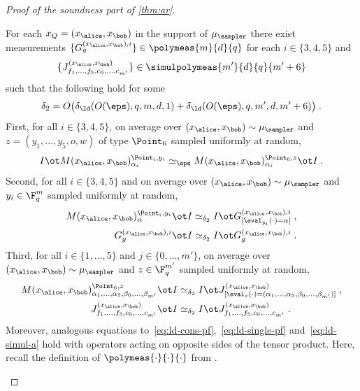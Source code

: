 \begin{proof}[Proof of the soundness part of \cref{thm:ar}]
  \begin{claim}
    \label{claim:ar-4}
    For each $x_Q=(x_\alice,x_\bob)$ in the support of $\mu_\sampler$ there
    exist measurements $\{G^{(x_\alice,x_\bob),i}_{g}\} \in \polymeas{m}{d}{q}$
    for each $i\in\{3,4,5\}$ and
    \begin{equation*}\{J^{({x}_\alice, {x}_\bob)}_{f_1, \dots, f_5, c_0,
      \dots, c_{m'}}\} \in \simulpolymeas{m'}{d}{q}{m'+6}
      \end{equation*}
      such that
    the following hold for some
    \begin{equation*}
      \delta_2 = O\big(\delta_{\ld}(O({\eps}), q, m, d, 1)+
      \delta_{\ld}(O({\eps}), q, m', d, m'+6)\big)\;.
    \end{equation*}
    First, for all $i\in \{3,4,5\}$, on average over $({x}_\alice, {x}_\bob)
    \sim \mu_{\sampler}$ and $z=(y_1,\ldots,y_5,o,w)$ of type $\Point_6$ sampled
    uniformly at random,
    \begin{equation}
      I \ot M({x}_\alice, {x}_\bob)^{ \Point_i, y_i}_{\alpha_i} \simeq_{\eps}
      M({x}_\alice, {x}_\bob)^{\Point_6, z}_{\alpha_i} \ot I\;.
      \label{eq:ld-cons-pf}
    \end{equation}
    Second, for all $i\in \{3,4,5\}$ and on average over $({x}_\alice, {x}_\bob)
    \sim \mu_{\sampler}$ and $y_i\in\F_q^m$ sampled uniformly at random,
    \begin{align}
      M({x}_\alice, {x}_\bob)^{\Point_i,  y_i}_{\alpha}\ot I
      &\simeq_{\delta_2} I \ot G^{({x}_\alice, {x}_\bob), i}_{[\eval_{y_i}(\cdot) =
        \alpha]}\;, \label{eq:ld-single-pf} \\
      G^{({x}_\alice, {x}_\bob), i}_{g} \ot I
      &\simeq_{\delta_2} I \ot G^{({x}_\alice, {x}_\bob),
        i}_{g}\;. \label{eq:ld-self-pf}
    \end{align}
    Third, for all $i\in\{1,\ldots,5\}$ and $j\in\{0,\ldots,m'\}$, on average
    over $({x}_\alice, {x}_\bob) \sim \mu_{\sampler}$ and $z\in\F_q^{m'}$
    sampled uniformly at random,
    \begin{align}
      M({x}_\alice, {x}_\bob)^{\Point_6,  z}_{\alpha_1, \ldots, \alpha_5,
      \beta_0, \ldots, \beta_{m'}} \ot I
      & \simeq_{\delta_2} I \ot J^{({x}_\alice, {x}_\bob) }_{[\eval_{z}(\cdot) =
        (\alpha_1,\ldots,\alpha_5,\beta_0,\ldots,\beta_{m'})]}\;,
        \label{eq:ld-simul-a}\\
      J^{({x}_\alice,{x}_\bob)}_{f_1, \dots, f_5, c_0, \dots, c_{m'}} \ot I
      &\simeq_{\delta_2} I \ot J^{({x}_\alice, {x}_\bob)}_{f_1, \dots, f_5,
        c_0, \dots, c_{m'}}\;.\label{eq:ld-self-simul}
    \end{align}
    Moreover, analogous equations
    to~\eqref{eq:ld-cons-pf},~\eqref{eq:ld-single-pf} and~\eqref{eq:ld-simul-a}
    hold with operators acting on opposite sides of the tensor product.
    Here, recall the definition of $\polymeas{\cdot}{\cdot}{\cdot}$ from
    .


\end{claim}
\end{proof}

